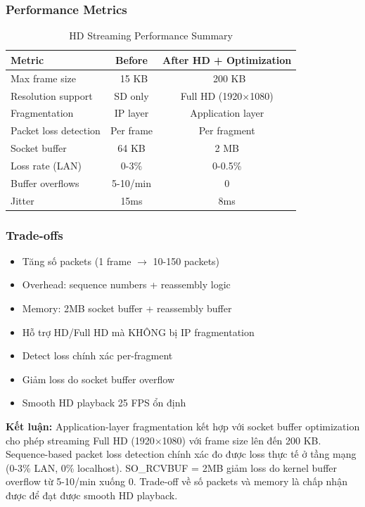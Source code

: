 \subsubsection{Performance Metrics}
\begin{table}[H]
\centering
\begin{tabular}{|l|c|c|}
\hline
\textbf{Metric} & \textbf{Before} & \textbf{After HD + Optimization} \\
\hline
Max frame size & ~15 KB & ~200 KB \\
Resolution support & SD only & Full HD (1920$\times$1080) \\
Fragmentation & IP layer & Application layer \\
Packet loss detection & Per frame & Per fragment \\
Socket buffer & 64 KB & 2 MB \\
Loss rate (LAN) & 0-3\% & 0-0.5\% \\
Buffer overflows & 5-10/min & 0 \\
Jitter & 15ms & 8ms \\
\hline
\end{tabular}
\caption{HD Streaming Performance Summary}
\end{table}

\subsubsection{Trade-offs}
\begin{itemize}
    \item [-] Tăng số packets (1 frame $\rightarrow$ 10-150 packets)
    \item [-] Overhead: sequence numbers + reassembly logic
    \item [-] Memory: 2MB socket buffer + reassembly buffer
    \item [+] Hỗ trợ HD/Full HD mà KHÔNG bị IP fragmentation
    \item [+] Detect loss chính xác per-fragment
    \item [+] Giảm loss do socket buffer overflow
    \item [+] Smooth HD playback 25 FPS ổn định
\end{itemize}

\textbf{Kết luận:} Application-layer fragmentation kết hợp với socket buffer optimization cho phép streaming Full HD (1920$\times$1080) với frame size lên đến 200 KB. Sequence-based packet loss detection chính xác đo được loss thực tế ở tầng mạng (0-3\% LAN, 0\% localhost). SO\_RCVBUF = 2MB giảm loss do kernel buffer overflow từ 5-10/min xuống 0. Trade-off về số packets và memory là chấp nhận được để đạt được smooth HD playback.

\clearpage
